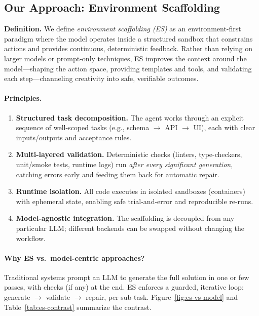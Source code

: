 \documentclass{article}
\begin{document}
\subsection{Our Approach: Environment Scaffolding}

\textbf{Definition.} We define \emph{environment scaffolding (ES)} as an environment-first paradigm where the model operates inside a structured sandbox that constrains actions and provides continuous, deterministic feedback. Rather than relying on larger models or prompt-only techniques, ES improves the context around the model---shaping the action space, providing templates and tools, and validating each step---channeling creativity into safe, verifiable outcomes.

\paragraph{Principles.}
\begin{enumerate}
  \item \textbf{Structured task decomposition.} The agent works through an explicit sequence of well-scoped tasks (e.g., schema $\rightarrow$ API $\rightarrow$ UI), each with clear inputs/outputs and acceptance rules.
  \item \textbf{Multi-layered validation.} Deterministic checks (linters, type-checkers, unit/smoke tests, runtime logs) run \emph{after every significant generation}, catching errors early and feeding them back for automatic repair.
  \item \textbf{Runtime isolation.} All code executes in isolated sandboxes (containers) with ephemeral state, enabling safe trial-and-error and reproducible re-runs.
  \item \textbf{Model-agnostic integration.} The scaffolding is decoupled from any particular LLM; different backends can be swapped without changing the workflow.
\end{enumerate}

\paragraph{Why ES vs.\ model-centric approaches?}
Traditional systems prompt an LLM to generate the full solution in one or few passes, with checks (if any) at the end. ES enforces a guarded, iterative loop: generate $\rightarrow$ validate $\rightarrow$ repair, per sub-task. Figure~\ref{fig:es-vs-model} and Table~\ref{tab:es-contrast} summarize the contrast.
\end{document}
